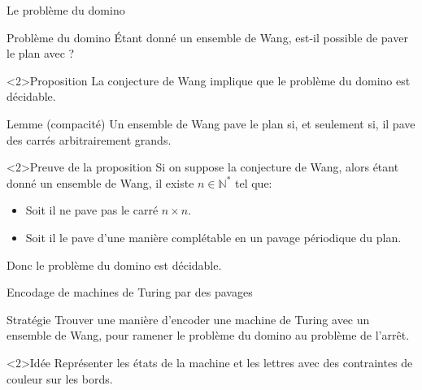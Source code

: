 \documentclass{beamer}
\newcommand{\N}{\mathbb N}
\begin{document}
    \begin{frame}{Le problème du domino}
    
    \begin{alertblock}{Problème du domino}
        Étant donné un ensemble de Wang, est-il possible de paver le plan avec ?
    \end{alertblock}
    
    \begin{block}<2>{Proposition}
        La conjecture de Wang implique que le problème du domino est décidable.
    \end{block}
    
    \end{frame}
    
    \begin{frame}
    
    \begin{block}{Lemme (compacité)}
        Un ensemble de Wang pave le plan si, et seulement si, il pave des carrés arbitrairement grands.
    \end{block}
    
    \begin{exampleblock}<2>{Preuve de la proposition}
        Si on suppose la conjecture de Wang, alors étant donné un ensemble de Wang, il existe $n\in\N^*$ tel que:
        \begin{itemize}
            \item Soit il ne pave pas le carré $n\times n$.
            \item Soit il le pave d'une manière complétable en un pavage périodique du plan. 
        \end{itemize}
        Donc le problème du domino est décidable.
    \end{exampleblock}
    
    \end{frame}
    
    \begin{frame}{Encodage de machines de Turing par des pavages}
    
    \begin{alertblock}{Stratégie}
        Trouver une manière d'encoder une machine de Turing avec un ensemble de Wang, pour ramener le problème du domino au problème de l'arrêt.
    \end{alertblock}
    
    \begin{block}<2>{Idée}
        Représenter les états de la machine et les lettres avec des contraintes de couleur sur les bords.
    \end{block}
    
    \end{frame}
    
\end{document}
